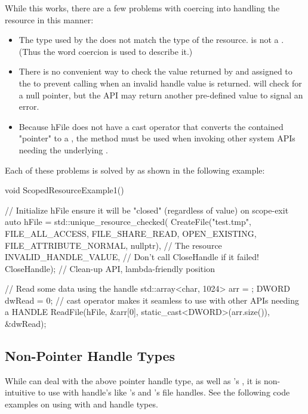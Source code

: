 \documentclass[ebook,11pt,article]{memoir}
\begin{document}
While this works, there are a few problems with coercing  into handling the resource in this manner:
\begin{itemize}
\item The type used by the  does not match the type of the resource.   is not a .  (Thus the word coercion is used to describe it.)
\item There is no convenient way to check the value returned by  and assigned to the  to prevent calling  when an invalid handle value is returned.   will check for a null pointer, but the  API may return another pre-defined value to signal an error.
\item Because hFile does not have a cast operator that converts the contained "pointer" to a , the  method must be used when invoking other system APIs needing the underlying .
\end{itemize}

Each of these problems is solved by  as shown in the following example:

\begin{codeblock}
void ScopedResourceExample1()
{
	// Initialize hFile ensure it will be "closed" (regardless of value) on scope-exit
	auto hFile = std::unique_resource_checked(
		CreateFile("test.tmp", 
			FILE_ALL_ACCESS, 
			FILE_SHARE_READ, 
			OPEN_EXISTING, 
			FILE_ATTRIBUTE_NORMAL,
			nullptr),           // The resource
		INVALID_HANDLE_VALUE,   // Don't call CloseHandle if it failed!
		CloseHandle);           // Clean-up API, lambda-friendly position

	// Read some data using the handle
	std::array<char, 1024> arr = { };
	DWORD dwRead = 0;
	// cast operator makes it seamless to use with other APIs needing a HANDLE
	ReadFile(hFile,
		&arr[0], 
		static_cast<DWORD>(arr.size()), 
		&dwRead);
}
\end{codeblock}

\subsection{Non-Pointer Handle Types}
While  can deal with the above pointer handle type, as well as 's , it is non-intuitive to use with handle's like 's and 's  file handles. See the following code examples on using  with  and  handle types.
\end{document}
